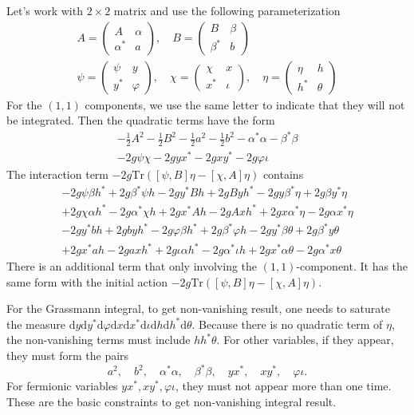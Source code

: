 Let's work with $2\times 2$ matrix and use the following parameterization
\begin{align*}
	A = \begin{pmatrix} A & \alpha \\ \alpha^* & a \end{pmatrix},\quad B = \begin{pmatrix} B & \beta \\ \beta^* & b \end{pmatrix} \\
	\psi = \begin{pmatrix} \psi & y \\ y^* & \varphi \end{pmatrix},\quad \chi = \begin{pmatrix} \chi & x \\ x^* & \iota \end{pmatrix} ,\quad \eta = \begin{pmatrix} \eta & h \\ h^* & \theta \end{pmatrix}
\end{align*}
For the $(1,1)$ components, we use the same letter to indicate that they will not be integrated.
Then the quadratic terms have the form
\begin{align*}
	- \frac{1}{2} A^2 - \frac{1}{2} B^2 - \frac{1}{2} a^2 - \frac{1}{2} b^2 - \alpha^* \alpha - \beta^* \beta \\
	- 2g \psi\chi - 2g y x^* - 2g x y^* - 2g \varphi \iota
\end{align*}
The interaction term $ -2 g \mathrm{Tr}([\psi,B]\eta - [\chi,A]\eta)$ contains
\begin{align*}
	-2 g \psi \beta h^* + 2 g \beta^* \psi h - 2g y^* B h + 2 g B y h^* - 2 g y \beta^* \eta + 2 g \beta y^* \eta \\
	+2 g \chi \alpha h^* - 2 g \alpha^* \chi h + 2g x^* A h - 2 g A x h^* + 2 g x \alpha^* \eta - 2 g \alpha x^* \eta \\
	-2 g y^* b h + 2 g b y h^* - 2g \varphi \beta h^* + 2g \beta^* \varphi h - 2g y^* \beta \theta + 2g \beta^* y \theta \\
	+2 g x^* a h - 2 g a x h^* + 2g \iota \alpha h^* - 2g \alpha^* \iota h + 2g x^* \alpha \theta - 2g \alpha^* x \theta 
\end{align*}
There is an additional term that only involving the $(1,1)$-component.
It has the same form with the initial action $ -2 g \mathrm{Tr}([\psi,B]\eta - [\chi,A]\eta)$.

For the Grassmann integral, to get non-vanishing result, one needs to saturate the measure $\mathrm{d}y \mathrm{d}y^* \mathrm{d}\varphi \mathrm{d}x \mathrm{d}x^* \mathrm{d}\iota \mathrm{d}h \mathrm{d}h^* \mathrm{d}\theta$.
Because there is no quadratic term of $\eta$, the non-vanishing terms must include $hh^*\theta$.
For other variables, if they appear, they must form the pairs
\[
a^2,\quad b^2,\quad \alpha^* \alpha,\quad \beta^* \beta,\quad y x^*,\quad x y^*,\quad \varphi \iota
.\]
For fermionic variables $yx^*,xy^*,\varphi\iota$, they must not appear more than one time.
These are the basic constraints to get non-vanishing integral result.

